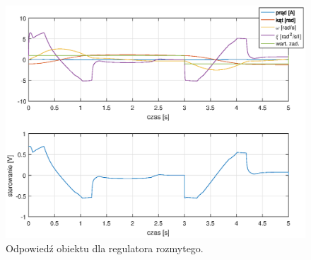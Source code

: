 \begin{figure}[h!]
	\centering
	\includegraphics[scale = 0.8]{fig/fuzzy_odp.eps}
	\caption		
	{Odpowied\'z obiektu dla regulatora rozmytego.}
	\label{fuzzyOdp}
\end{figure}

